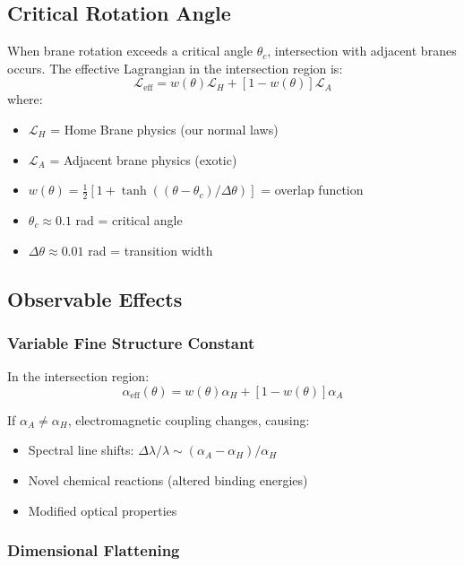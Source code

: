 \subsection{Critical Rotation Angle}

When brane rotation exceeds a critical angle $\theta_c$, intersection with adjacent branes occurs. The effective Lagrangian in the intersection region is:
\begin{equation}
\mathcal{L}_{\text{eff}} = w(\theta)\mathcal{L}_H + [1-w(\theta)]\mathcal{L}_A
\end{equation}
where:
\begin{itemize}
\item $\mathcal{L}_H$ = Home Brane physics (our normal laws)
\item $\mathcal{L}_A$ = Adjacent brane physics (exotic)
\item $w(\theta) = \frac{1}{2}[1 + \tanh((\theta - \theta_c)/\Delta\theta)]$ = overlap function
\item $\theta_c \approx 0.1$ rad = critical angle
\item $\Delta\theta \approx 0.01$ rad = transition width
\end{itemize}

\subsection{Observable Effects}

\subsubsection{Variable Fine Structure Constant}

In the intersection region:
\begin{equation}
\alpha_{\text{eff}}(\theta) = w(\theta)\alpha_H + [1-w(\theta)]\alpha_A
\end{equation}

If $\alpha_A \neq \alpha_H$, electromagnetic coupling changes, causing:
\begin{itemize}
\item Spectral line shifts: $\Delta\lambda/\lambda \sim (\alpha_A - \alpha_H)/\alpha_H$
\item Novel chemical reactions (altered binding energies)
\item Modified optical properties
\end{itemize}

\subsubsection{Dimensional Flattening}

